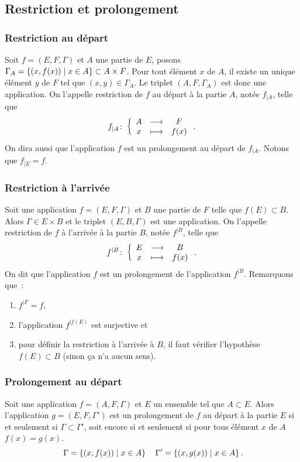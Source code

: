 %
\subsection{Restriction et prolongement}
\label{chap3-restrictionetprolongement}
\subsubsection{Restriction au départ} 
\label{chap3-subsubsec:restrictiondep}
Soit \(f=(E,F,\Gamma)\) et \(A\) une partie de \(E\), posons \(\Gamma_A=\left\{(x,f(x))\mathrel{}\middle|\mathrel{}x \in A\right\} \subset A \times F\). Pour
tout élément \(x\) de \(A\), il existe un unique élément \(y\) de \(F\) tel que \((x,y) \in \Gamma_A\). Le triplet \((A,F, \Gamma_A)\) est donc une application. On l'appelle restriction de \(f\) au départ à la partie \(A\), notée \(f_{|A}\), telle que
\begin{equation}
f_{|A}\colon \left\{\begin{array}{ccc} A & \longrightarrow &F\\ x & \longmapsto & f(x) \end{array} \right..
\end{equation}
On dira aussi que l'application \(f\) est un prolongement au départ de \(f_{|A}\). Notons que \(f_{|E}=f\).
%
\subsubsection{Restriction à l'arrivée}
\label{chap3-subsubsec:restrictionarr}
Soit une application \(f=(E,F,\Gamma)\) et \(B\) une partie de \(F\) telle que \(f(E) \subset B\). Alors \(\Gamma \in E \times B\) et le triplet \((E,B,\Gamma)\) est une application. On l'appelle restriction de \(f\) à l'arrivée à la partie \(B\), notée \(f^{|B}\), telle que
\begin{equation}
f^{|B}\colon \left\{\begin{array}{ccc} E & \longrightarrow &B\\ x & \longmapsto & f(x) \end{array} \right..
\end{equation}
On dit que l'application \(f\) est un prolongement de l'application \(f^{|B}\). Remarquons que~:
\begin{enumerate}
    \item \(f^{|F}=f\), 
    \item l'application \(f^{|f(E)}\) est surjective et 
    \item pour définir la restriction à l'arrivée à \(B\), il faut vérifier l'hypothèse \(f(E) \subset B\) (sinon ça n'a aucun sens).
\end{enumerate}

\subsubsection{Prolongement au départ}
\label{chap3-subsubsec:prolongementdep}
Soit une application \(f=(A,F,\Gamma)\) et \(E\) un ensemble tel que \(A \subset E\). Alors l'application \(g=(E,F,\Gamma')\) est un prolongement de \(f\) au départ à la partie \(E\) si et seulement si \(\Gamma \subset \Gamma'\), soit encore si et seulement si pour tous élément \(x\) de \(A\) \(f(x)=g(x)\).
\begin{equation}\
\Gamma=\left\{(x,f(x))\mathrel{}\middle|\mathrel{}x \in A\right\} \quad \Gamma'=\left\{(x,g(x))\mathrel{}\middle|\mathrel{}x \in A\right\}.
\end{equation}
